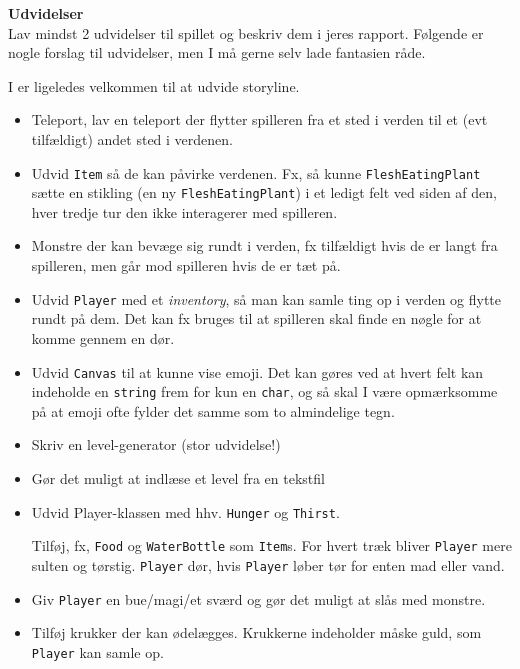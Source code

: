 \textbf{Udvidelser}\\
Lav mindst 2 udvidelser til spillet og beskriv dem i jeres
rapport. Følgende er nogle forslag til udvidelser, men I må gerne selv lade
fantasien råde.

I er ligeledes velkommen til at udvide storyline.

\begin{itemize}
\item Teleport, lav en teleport der flytter spilleren fra et sted i
  verden til et (evt tilfældigt) andet sted i verdenen.
\item Udvid \lstinline{Item} så de kan påvirke verdenen. Fx, så kunne
  \lstinline{FleshEatingPlant} sætte en stikling (en ny
  \lstinline{FleshEatingPlant}) i et ledigt felt ved
  siden af den, hver tredje tur den ikke interagerer med spilleren.
\item Monstre der kan bevæge sig rundt i verden, fx tilfældigt hvis de
  er langt fra spilleren, men går mod spilleren hvis de er tæt på.
\item Udvid \lstinline{Player} med et \emph{inventory}, så man kan samle ting op i
  verden og flytte rundt på dem. Det kan fx bruges til at spilleren
  skal finde en nøgle for at komme gennem en dør.
\item Udvid \lstinline{Canvas} til at kunne vise emoji. Det kan gøres ved at
  hvert felt kan indeholde en \lstinline{string} frem for kun en \lstinline{char}, og så
  skal I være opmærksomme på at emoji ofte fylder det samme som to
  almindelige tegn.
\item Skriv en level-generator (stor udvidelse!)
\item Gør det muligt at indlæse et level fra en tekstfil
\item Udvid Player-klassen med hhv. \lstinline{Hunger} og \lstinline{Thirst}.

  Tilføj, fx, \lstinline{Food} og \lstinline{WaterBottle} som
  \lstinline{Item}s. For hvert træk bliver \lstinline{Player} mere
  sulten og tørstig. \lstinline{Player} dør, hvis \lstinline{Player}
  løber tør for enten mad eller vand.

\item Giv \lstinline{Player} en bue/magi/et sværd og gør det muligt at slås med monstre.
\item Tilføj krukker der kan ødelægges. Krukkerne indeholder måske
  guld, som \lstinline{Player} kan samle op.
\end{itemize}

